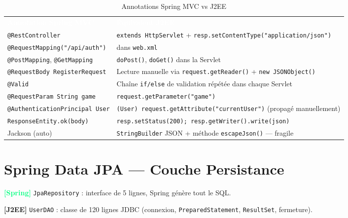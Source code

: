 \documentclass[11pt,a4paper]{article}
\newcommand{\spring}[1]{\textcolor{springgreen}{\textbf{[Spring]}} #1}
\newcommand{\jee}[1]{\textcolor{j2eered}{\textbf{[J2EE]}} #1}
\newcommand{\code}[1]{\texttt{\small #1}}
\newcommand{\theadrow}[2]{%
  \rowcolor{headerbg}\textcolor{white}{\textbf{#1}} & \textcolor{white}{\textbf{#2}}\\}
\begin{document}
\begin{table}[h!]
\centering
\renewcommand{\arraystretch}{1.35}
\begin{tabularx}{\linewidth}{L{4.8cm} X}
\theadrow{Annotation Spring MVC}{Équivalent J2EE}
\code{@RestController}               & \code{extends HttpServlet} + \code{resp.setContentType("application/json")} \\
\code{@RequestMapping("/api/auth")}  & \code{<url-pattern>} dans \code{web.xml} \\
\code{@PostMapping}, \code{@GetMapping} & \code{doPost()}, \code{doGet()} dans la Servlet \\
\code{@RequestBody RegisterRequest}  & Lecture manuelle via \code{request.getReader()} + \code{new JSONObject()} \\
\code{@Valid}                        & Chaîne \code{if/else} de validation répétée dans chaque Servlet \\
\code{@RequestParam String game}     & \code{request.getParameter("game")} \\
\code{@AuthenticationPrincipal User} & \code{(User) request.getAttribute("currentUser")} (propagé manuellement) \\
\code{ResponseEntity.ok(body)}       & \code{resp.setStatus(200); resp.getWriter().write(json)} \\
Jackson (auto)                       & \code{StringBuilder} JSON + méthode \code{escapeJson()} — fragile \\
\bottomrule
\end{tabularx}
\caption{Annotations Spring MVC vs J2EE}
\end{table}

\section{Spring Data JPA — Couche Persistance}

\spring{\code{JpaRepository} : interface de 5 lignes, Spring génère tout le SQL.}

\jee{\code{UserDAO} : classe de 120 lignes JDBC (connexion, \code{PreparedStatement}, \code{ResultSet}, fermeture).}
\end{document}

